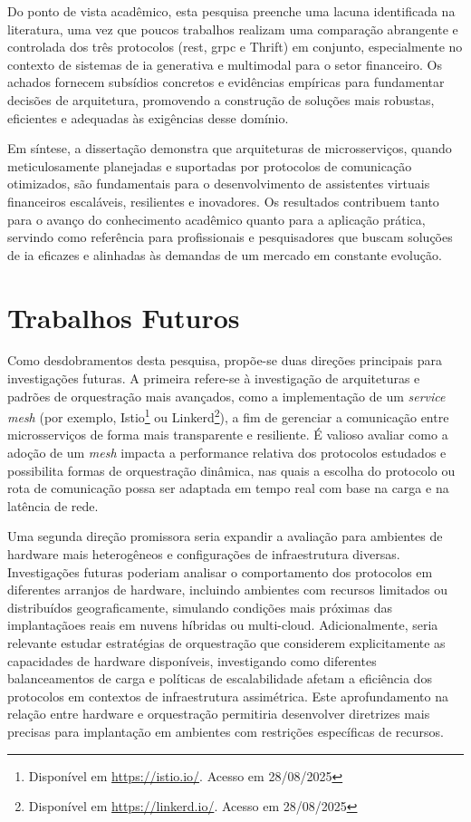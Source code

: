 Do ponto de vista acadêmico, esta pesquisa preenche uma lacuna identificada na literatura, uma vez que poucos trabalhos realizam uma comparação abrangente e controlada dos três protocolos (\gls{rest}, \gls{grpc} e Thrift) em conjunto, especialmente no contexto de sistemas de \gls{ia} generativa e multimodal para o setor financeiro. Os achados fornecem subsídios concretos e evidências empíricas para fundamentar decisões de arquitetura, promovendo a construção de soluções mais robustas, eficientes e adequadas às exigências desse domínio.

Em síntese, a dissertação demonstra que arquiteturas de microsserviços, quando meticulosamente planejadas e suportadas por protocolos de comunicação otimizados, são fundamentais para o desenvolvimento de assistentes virtuais financeiros escaláveis, resilientes e inovadores. Os resultados contribuem tanto para o avanço do conhecimento acadêmico quanto para a aplicação prática, servindo como referência para profissionais e pesquisadores que buscam soluções de \acrfull{ia} eficazes e alinhadas às demandas de um mercado em constante evolução.

\section{Trabalhos Futuros}

Como desdobramentos desta pesquisa, propõe-se duas direções principais para investigações futuras. A primeira refere-se à investigação de arquiteturas e padrões de orquestração mais avançados, como a implementação de um \textit{service mesh} (por exemplo, Istio\footnote{Disponível em \hyperlink{https://istio.io/}{https://istio.io/}. Acesso em 28/08/2025} ou Linkerd\footnote{Disponível em \hyperlink{https://linkerd.io/}{https://linkerd.io/}. Acesso em 28/08/2025}), a fim de gerenciar a comunicação entre microsserviços de forma mais transparente e resiliente. É valioso avaliar como a adoção de um \textit{mesh} impacta a performance relativa dos protocolos estudados e possibilita formas de orquestração dinâmica, nas quais a escolha do protocolo ou rota de comunicação possa ser adaptada em tempo real com base na carga e na latência de rede.

Uma segunda direção promissora seria expandir a avaliação para ambientes de hardware mais heterogêneos e configurações de infraestrutura diversas. Investigações futuras poderiam analisar o comportamento dos protocolos em diferentes arranjos de hardware, incluindo ambientes com recursos limitados ou distribuídos geograficamente, simulando condições mais próximas das implantaçãoes reais em nuvens híbridas ou multi-cloud. Adicionalmente, seria relevante estudar estratégias de orquestração que considerem explicitamente as capacidades de hardware disponíveis, investigando como diferentes balanceamentos de carga e políticas de escalabilidade afetam a eficiência dos protocolos em contextos de infraestrutura assimétrica. Este aprofundamento na relação entre hardware e orquestração permitiria desenvolver diretrizes mais precisas para implantação em ambientes com restrições específicas de recursos.